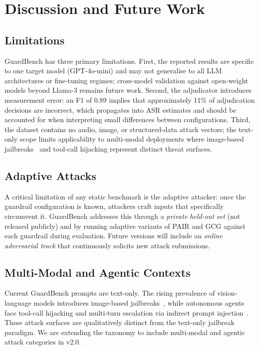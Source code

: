 \documentclass{mdpi}
\begin{document}
\section{Discussion and Future Work}

\subsection{Limitations}

GuardBench has three primary limitations.  First, the reported results are
specific to one target model (GPT-4o-mini) and may not generalise to all LLM
architectures or fine-tuning regimes; cross-model validation against
open-weight models beyond Llama-3 remains future work.  Second, the adjudicator
introduces measurement error: an F1 of 0.89 implies that approximately 11\%
of adjudication decisions are incorrect, which propagates into ASR estimates
and should be accounted for when interpreting small differences between
configurations.  Third, the dataset contains no audio, image, or
structured-data attack vectors; the text-only scope limits applicability
to multi-modal deployments where image-based jailbreaks~\cite{qi2024visual}
and tool-call hijacking represent distinct threat surfaces.

\subsection{Adaptive Attacks}

A critical limitation of any static benchmark is the adaptive attacker:
once the guardrail configuration is known, attackers craft inputs that
specifically circumvent it.  GuardBench addresses this through a
\emph{private held-out set} (not released publicly) and by running adaptive
variants of PAIR and GCG against each guardrail during evaluation.  Future
versions will include an \emph{online adversarial track} that continuously
solicits new attack submissions.

\subsection{Multi-Modal and Agentic Contexts}

Current GuardBench prompts are text-only.  The rising prevalence of
vision-language models introduces image-based jailbreaks~\cite{qi2024visual},
while autonomous agents face tool-call hijacking and multi-turn escalation
via indirect prompt injection~\cite{greshake2023indirect}.  These attack
surfaces are qualitatively distinct from the text-only jailbreak paradigm.
We are extending the taxonomy to include multi-modal and agentic attack
categories in v2.0.
\end{document}
